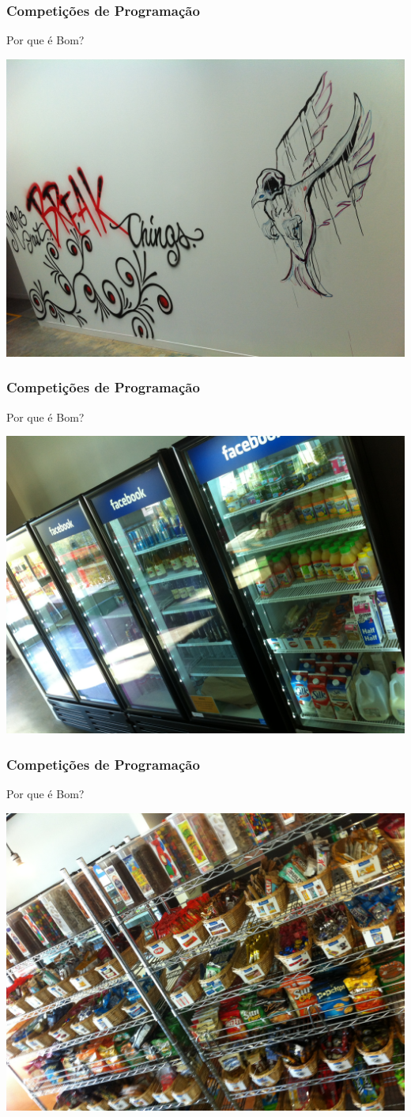 \begin{frame}
\frametitle{Competições de Programação}
\begin{block}{Por que é Bom?}
\begin{center}
	\includegraphics[width=.7\textwidth]{sntc/IMG_2045.JPG}
\end{center}
\end{block}
\end{frame}
\begin{frame}
\frametitle{Competições de Programação}
\begin{block}{\tiny{Por que é Bom?}}
\begin{center}
	\includegraphics[width=.7\textwidth]{sntc/IMG_2049.JPG}
\end{center}
\end{block}
\end{frame}
\begin{frame}
\frametitle{Competições de Programação}
\begin{block}{Por que é Bom?}
\begin{center}
	\includegraphics[width=.7\textwidth]{sntc/IMG_2050.JPG}
\end{center}
\end{block}
\end{frame}
